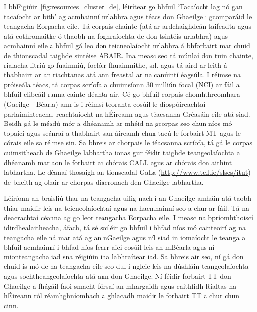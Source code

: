 \begin{multicols}{2}
I bhFigiúir~\ref{fig:resources_cluster_de}, léirítear go bhfuil ‘Tacaíocht lag nó gan tacaíocht ar bith’ ag acmhainní urlabhra agus téacs don Ghaeilge i gcomparáid le teangacha Eorpacha eile. Tá corpais chainte (atá ar ardchaighdeán taifeadta agus atá cothromaithe ó thaobh na foghraíochta de don tsintéis urlabhra) agus acmhainní eile a bhfuil gá leo don teicneolaíocht urlabhra á bhforbairt mar chuid de thionscadal taighde sintéise ABAIR. Ina measc seo tá múnlaí don tuin chainte, rialacha litriú-go-fuaimniú, foclóir fhuaimnithe, srl. agus tá aird ar leith á thabhairt ar an riachtanas atá ann freastal ar na canúintí éagsúla. I réimse na próiseála téacs, tá corpas scríofa a chuimsíonn 30 milliún focal (NCI) ar fáil a bhfuil clibeáil ranna cainte déanta air. Cé go bhfuil corpais chomhthreomhara (Gaeilge - Béarla) ann \cite{scannell} is i réimsí teoranta cosúil le díospóireachtaí parlaiminteacha, reachtaíocht na hÉireann agus téacsanna Gréasáin eile atá siad. Beidh gá le méadú mór a dhéanamh ar mhéid na gcorpas seo chun níos mó topaicí agus seánraí a thabhairt san áireamh chun tacú le forbairt MT agus le córais eile sa réimse sin. Sa bhreis ar chorpais le téacsanna scríofa, tá gá le corpas cuimsitheach de Ghaeilge labhartha ionas gur féidir taighde teangeolaíochta a dhéanamh mar aon le forbairt ar chórais CALL agus ar chórais don aithint labhartha. Le déanaí thosaigh an tionscadal GaLa (\url{http://www.tcd.ie/slscs/itut}) de bheith ag obair ar chorpas diacronach den Ghaeilge labhartha.

Léiríonn an braisliú thar na teangacha uilig nach í an Ghaeilge amháin atá taobh thiar maidir leis na teicneolaíochtaí agus na hacmhainní seo a chur ar fáil. Tá na deacrachtaí céanna ag go leor teangacha Eorpacha eile. I measc na bpríomhthoiscí idirdhealaitheacha, áfach, tá sé soiléir go bhfuil i bhfad níos mó cainteoirí ag na teangacha eile ná mar atá ag an nGaeilge agus níl siad in iomaíocht le teanga a bhfuil acmhainní i bhfad níos fearr aici cosúil leis an mBéarla agus ní mionteangacha iad sna réigiúin ina labhraítear iad. Sa bhreis air seo, ní gá don chuid is mó de na teangacha eile seo dul i ngleic leis na dúshláin teangeolaíochta agus sochtheangeolaíochta atá ann don Ghaeilge. Ní féidir forbairt TT don Ghaeilge a fhágáil faoi smacht fórsaí an mhargaidh agus caithfidh Rialtas na hÉireann ról réamhghníomhach a ghlacadh maidir le forbairt TT a chur chun cinn.


\end{multicols}
